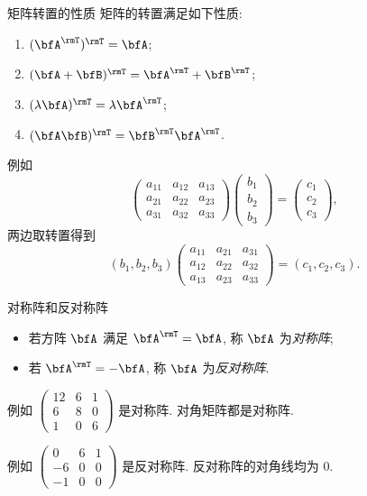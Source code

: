 \begin{frame}{矩阵转置的性质}
	\onslide<+->
	矩阵的转置满足如下性质:
	\begin{enumerate}\bf
		\item $(\bfA^\rmT)^\rmT=\bfA$;
		\item $(\bfA+\bfB)^\rmT=\bfA^\rmT+\bfB^\rmT$;
		\item $(\lambda\bfA)^\rmT=\lambda\bfA^\rmT$;
		\item \alert{$(\bfA\bfB)^\rmT=\bfB^\rmT\bfA^\rmT$}.
	\end{enumerate}
	\onslide<+->
	例如
	\[\begin{pmatrix}
		a_{11}&a_{12}&a_{13}\\
		a_{21}&a_{22}&a_{23}\\
		a_{31}&a_{32}&a_{33}
	\end{pmatrix}\begin{pmatrix}
		b_1\\b_2\\b_3
	\end{pmatrix}=\begin{pmatrix}
		c_1\\c_2\\c_3
	\end{pmatrix},\]
	\onslide<+->
	两边取转置得到
	\[(b_1,b_2,b_3)\begin{pmatrix}
		a_{11}&a_{21}&a_{31}\\
		a_{12}&a_{22}&a_{32}\\
		a_{13}&a_{23}&a_{33}
	\end{pmatrix}=(c_1,c_2,c_3).\]
\end{frame}


\begin{frame}{对称阵和反对称阵}
	\onslide<+->
	\begin{definition}
		\begin{itemize}
			\item 若方阵 $\bfA$ 满足 $\bfA^\rmT=\bfA$, 称 $\bfA$ 为\emph{对称阵};
			\item 若 $\bfA^\rmT=-\bfA$, 称 $\bfA$ 为\emph{反对称阵}.
		\end{itemize}
	\end{definition}
	\onslide<+->
	例如 $\begin{pmatrix}
		12&6&1\\
		6&8&0\\
		1&0&6
	\end{pmatrix}$
	是对称阵.
	\onslide<+->
	对角矩阵都是对称阵.

	\onslide<+->
	例如 $\begin{pmatrix}
		0&6&1\\
		-6&0&0\\
		-1&0&0
	\end{pmatrix}$
	是反对称阵.
	\onslide<+->
	反对称阵的对角线均为 $0$.
\end{frame}



